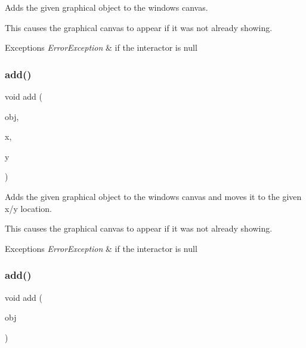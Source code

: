 Adds the given graphical object to the window\textquotesingle{}s canvas. 

This causes the graphical canvas to appear if it was not already showing. 
\begin{DoxyExceptions}{Exceptions}
{\em Error\+Exception} & if the interactor is null \\
\hline
\end{DoxyExceptions}
\mbox{\label{classGWindow_ab5388ece7a50b46e0ee72e11fe202609}} 
\subsubsection{\texorpdfstring{add()}{add()}\hspace{0.1cm}{\footnotesize\ttfamily [6/8]}}
{\footnotesize\ttfamily void add (\begin{DoxyParamCaption}\item[{\mbox{\hyperlink{classGObject}{G\+Object}} $\ast$}]{obj,  }\item[{double}]{x,  }\item[{double}]{y }\end{DoxyParamCaption})\hspace{0.3cm}{\ttfamily [virtual]}}



Adds the given graphical object to the window\textquotesingle{}s canvas and moves it to the given x/y location. 

This causes the graphical canvas to appear if it was not already showing. 
\begin{DoxyExceptions}{Exceptions}
{\em Error\+Exception} & if the interactor is null \\
\hline
\end{DoxyExceptions}
\mbox{\label{classGWindow_a7f596867e2d8f9dfb816b3d496ea074f}} 
\subsubsection{\texorpdfstring{add()}{add()}\hspace{0.1cm}{\footnotesize\ttfamily [7/8]}}
{\footnotesize\ttfamily void add (\begin{DoxyParamCaption}\item[{\mbox{\hyperlink{classGObject}{G\+Object}} \&}]{obj }\end{DoxyParamCaption})\hspace{0.3cm}{\ttfamily [virtual]}}



